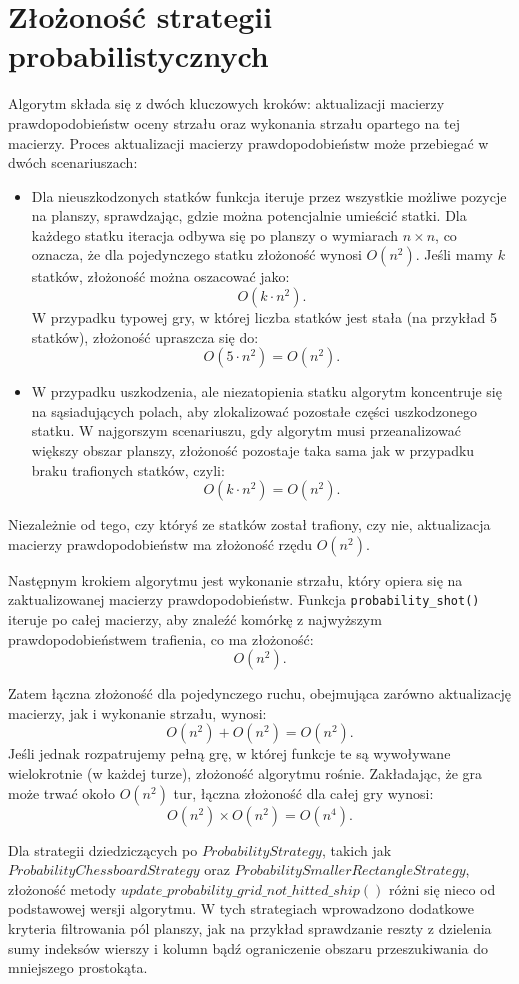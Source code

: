 \documentclass[magisterska]{pracadypl}
\begin{document}
{\section{Złożoność strategii probabilistycznych}
Algorytm składa się z dwóch kluczowych kroków: aktualizacji macierzy prawdopodobieństw oceny strzału oraz wykonania strzału opartego na tej macierzy. Proces aktualizacji macierzy prawdopodobieństw może przebiegać w dwóch scenariuszach:

\begin{itemize}
  \item Dla nieuszkodzonych statków funkcja iteruje przez wszystkie możliwe pozycje na planszy, sprawdzając, gdzie można potencjalnie umieścić statki. Dla każdego statku iteracja odbywa się po planszy o wymiarach $n \times n$, co oznacza, że dla pojedynczego statku złożoność wynosi $O(n^2)$. Jeśli mamy $k$ statków, złożoność można oszacować jako:
  $$
  O(k \cdot n^2).
  $$
  W przypadku typowej gry, w której liczba statków jest stała (na przykład 5 statków), złożoność upraszcza się do:
  $$
  O(5 \cdot n^2) = O(n^2).
  $$

  \item W przypadku uszkodzenia, ale niezatopienia statku algorytm koncentruje się na sąsiadujących polach, aby zlokalizować pozostałe części uszkodzonego statku. W najgorszym scenariuszu, gdy algorytm musi przeanalizować większy obszar planszy, złożoność pozostaje taka sama jak w przypadku braku trafionych statków, czyli:
  $$
  O(k \cdot n^2) = O(n^2).
  $$ 
\end{itemize}

Niezależnie od tego, czy któryś ze statków został trafiony, czy nie, aktualizacja macierzy prawdopodobieństw ma złożoność rzędu $O(n^2)$.

Następnym krokiem algorytmu jest wykonanie strzału, który opiera się na zaktualizowanej macierzy prawdopodobieństw. Funkcja \texttt{probability\_shot()} iteruje po całej macierzy, aby znaleźć komórkę z najwyższym prawdopodobieństwem trafienia, co ma złożoność:
$$
O(n^2).
$$

Zatem łączna złożoność dla pojedynczego ruchu, obejmująca zarówno aktualizację macierzy, jak i wykonanie strzału, wynosi:
$$
O(n^2) + O(n^2) = O(n^2).
$$
Jeśli jednak rozpatrujemy pełną grę, w której funkcje te są wywoływane wielokrotnie (w każdej turze), złożoność algorytmu rośnie. Zakładając, że gra może trwać około $O(n^2)$ tur, łączna złożoność dla całej gry wynosi:
$$
O(n^2) \times O(n^2) = O(n^4).
$$

Dla strategii dziedziczących po $ProbabilityStrategy$, takich jak \newline $ProbabilityChessboardStrategy$ oraz $ProbabilitySmallerRectangleStrategy$, złożoność metody $update\_probability\_grid\_not\_hitted\_ship()$ różni się nieco od podstawowej wersji algorytmu. W tych strategiach wprowadzono dodatkowe kryteria filtrowania pól planszy, jak na przykład sprawdzanie reszty z dzielenia sumy indeksów wierszy i kolumn bądź ograniczenie obszaru przeszukiwania do mniejszego prostokąta. 

}
\end{document}
